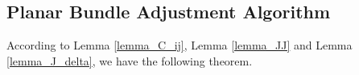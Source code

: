 \documentclass{vgtc}                          %
\begin{document}


\subsection{Planar Bundle Adjustment Algorithm}
According to Lemma \autoref{lemma_C_ij}, Lemma \autoref{lemma_JJ} and Lemma \ref{lemma_J_delta}, we have the following theorem.
\end{document}

